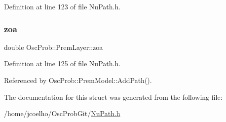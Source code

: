 Definition at line 123 of file Nu\+Path.\+h.

\mbox{\label{structOscProb_1_1PremLayer_a8687a8169d786fca79908292d11077f5}} 
\subsubsection{\texorpdfstring{zoa}{zoa}}
{\footnotesize\ttfamily double Osc\+Prob\+::\+Prem\+Layer\+::zoa}



Definition at line 125 of file Nu\+Path.\+h.



Referenced by Osc\+Prob\+::\+Prem\+Model\+::\+Add\+Path().



The documentation for this struct was generated from the following file\+:\begin{DoxyCompactItemize}
\item 
/home/jcoelho/\+Osc\+Prob\+Git/\hyperlink{NuPath_8h}{Nu\+Path.\+h}\end{DoxyCompactItemize}
